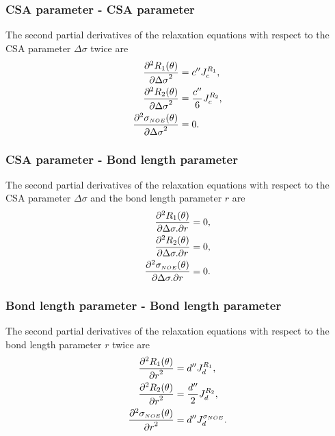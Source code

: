 \subsubsection{CSA parameter - CSA parameter}

The second partial derivatives of the relaxation equations with respect to the CSA parameter $\Delta\sigma$ twice are
\begin{align}
    \frac{\partial^2 R_1(\theta)}{{\partial \Delta\sigma}^2} &= c'' J_c^{R_1},              \label{eq: Ri': d2R1/dCSA2} \\
    \frac{\partial^2 R_2(\theta)}{{\partial \Delta\sigma}^2} &= \frac{c''}{6} J_c^{R_2},    \label{eq: Ri': d2R2/dCSA2} \\
    \frac{\partial^2 \sigma_{\scriptscriptstyle NOE}(\theta)}{{\partial \Delta\sigma}^2} &= 0.                    \label{eq: Ri': d2sigmaNOE/dCSA2}
\end{align}


\subsubsection{CSA parameter - Bond length parameter}

The second partial derivatives of the relaxation equations with respect to the CSA parameter $\Delta\sigma$ and the bond length parameter $r$ are
\begin{align}
    \frac{\partial^2 R_1(\theta)}{\partial \Delta\sigma . \partial r} &= 0,         \label{eq: Ri': d2R1/dCSA.dr} \\
    \frac{\partial^2 R_2(\theta)}{\partial \Delta\sigma . \partial r} &= 0,         \label{eq: Ri': d2R2/dCSA.dr} \\
    \frac{\partial^2 \sigma_{\scriptscriptstyle NOE}(\theta)}{\partial \Delta\sigma . \partial r} &= 0.   \label{eq: Ri': d2sigmaNOE/dCSA.dr}
\end{align}


\subsubsection{Bond length parameter - Bond length parameter}

The second partial derivatives of the relaxation equations with respect to the bond length parameter $r$ twice are
\begin{align}
    \frac{\partial^2 R_1(\theta)}{{\partial r}^2} &= d'' J_d^{R_1},                 \label{eq: Ri': d2R1/dr2} \\
    \frac{\partial^2 R_2(\theta)}{{\partial r}^2} &= \frac{d''}{2} J_d^{R_2},       \label{eq: Ri': d2R2/dr2} \\
    \frac{\partial^2 \sigma_{\scriptscriptstyle NOE}(\theta)}{{\partial r}^2} &= d'' J_d^{\sigma_{\scriptscriptstyle NOE}}.     \label{eq: Ri': d2sigmaNOE/dr2}
\end{align}



